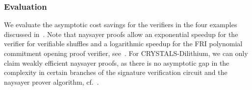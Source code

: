 \subsubsection{Evaluation}
We evaluate the asymptotic cost savings for the verifiers in the four examples discussed in~. Note that naysayer proofs allow an exponential speedup for the verifier for verifiable shuffles and a logarithmic speedup for the FRI polynomial commitment opening proof verifier, see~. For CRYSTALS-Dilithium, we can only claim weakly efficient naysayer proofs, as there is no asymptotic gap in the complexity in certain branches of the signature verification circuit and the naysayer prover algorithm, cf.~.


